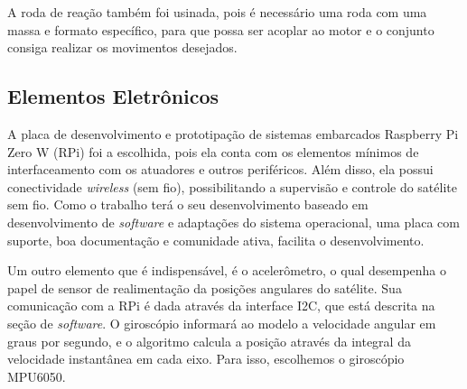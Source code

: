 A roda de reação também foi usinada, pois é necessário uma roda com uma massa e formato específico, para que possa ser acoplar ao motor e o conjunto consiga realizar os movimentos desejados. 



\subsection{Elementos Eletrônicos}

A placa de desenvolvimento e prototipação de sistemas embarcados Raspberry Pi Zero W (RPi) foi a escolhida, pois ela conta com os elementos mínimos de interfaceamento com os atuadores e outros periféricos. Além disso, ela possui conectividade \textit{wireless} (sem fio), possibilitando a supervisão e controle do satélite sem fio. Como o trabalho terá o seu desenvolvimento baseado em desenvolvimento de \textit{software} e adaptações do sistema operacional, uma placa com suporte, boa documentação e comunidade ativa, facilita o desenvolvimento. 



Um outro elemento que é indispensável, é o acelerômetro, o qual desempenha o papel de sensor de realimentação da posições angulares do satélite. Sua comunicação com a RPi é dada através da interface I2C, que está descrita na seção de \textit{software}. O giroscópio informará ao modelo a velocidade angular em graus por segundo, e o algoritmo calcula a posição através da integral da velocidade instantânea em cada eixo. Para isso, escolhemos o giroscópio MPU6050.


